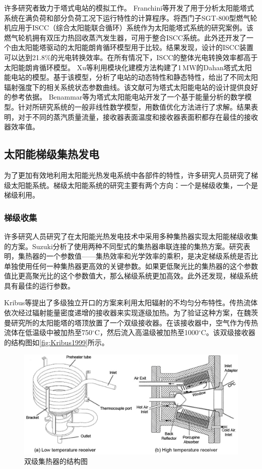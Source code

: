 许多研究者致力于塔式电站的模拟工作。
Franchini等\cite{Franchini2013}开发了用于分析太阳能塔式系统在满负荷和部分负荷工况下运行特性的计算程序。将西门子SGT-800型燃气轮机应用于ISCC（综合太阳能联合循环）系统作为太阳能塔式系统的研究案例。该燃气轮机拥有双压力热回收蒸汽发生器，可用于整合ISCC系统。此外还开发了一个由太阳能塔驱动的太阳能朗肯循环模型用于比较。结果发现，设计的ISCC装置可以达到21.8\%的光电转换效率。在所有情况下，ISCC的整体光电转换效率都高于太阳能朗肯循环模型。
Xu等\cite{Xu2011a,Xu2012}利用模块化建模方法构建了1$\,\mathrm{MW}$的Dahan塔式太阳能电站的模型。基于该模型，分析了电站的动态特性和静态特性，给出了不同太阳辐射强度下的相关系统状态参数曲线。该文献可为塔式太阳能电站的设计提供良好的参考依据。
Benammar等\cite{Benammar2014}为塔式太阳能电站开发了一个基于能量分析的数学模型。针对所研究系统的一般非线性数学模型，用数值优化方法进行了求解。结果表明，对于不同的蒸汽质量流量，接收器表面温度和接收器表面积都存在最佳的接收器效率值。

\subsection{太阳能梯级集热发电}
\label{sec:cs}

为了更加有效地利用太阳能光热发电系统中各部件的特性，许多研究人员研究了梯级太阳能系统。梯级太阳能系统的研究主要有两个方向：一个是梯级收集，一个是梯级利用。

\subsubsection{梯级收集}

许多研究人员研究了在太阳能光热发电技术中采用多种集热器实现太阳能梯级收集的方案。Suzuki\cite{Suzuki1986}分析了使用两种不同型式的集热器串联连接的集热方案。研究表明，集热器的一个参数值——集热效率和光学效率的乘积，是决定梯级系统是否比单独使用任何一种集热器更高效的关键参数。如果更低聚光比的集热器的这个参数值比更高聚光比的这个参数值大，那么梯级系统更加高效。此外还发现，梯级系统具有最佳的运行参数。

Kribus等\cite{Kribus1999}提出了多级独立开口的方案来利用太阳辐射的不均匀分布特性。传热流体依次经过辐射能量密度递增的接收器来实现逐级加热。为了验证这种方案，在魏茨曼研究所的太阳能塔的塔顶放置了一个双级接收器。在该接收器中，空气作为传热流体在低温级中被加热至750$\mathrm{^\circ C}$，然后流入高温级被加热至1000$\mathrm{^\circ C}$。该双级接收器的结构图如\autoref{fig:Kribus1999}所示。

\begin{figure}[!ht]
\centering
\includegraphics[width=.8\textwidth]{fig/Kribus1999.jpg}
\caption{双级集热器的结构图}
\label{fig:Kribus1999}
\end{figure}


